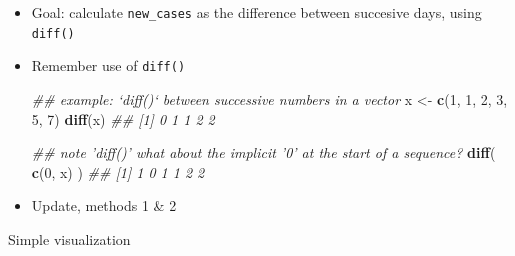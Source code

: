 \documentclass[
]{book}
\newenvironment{Shaded}{\begin{snugshade}}{\end{snugshade}}
\newcommand{\CommentTok}[1]{\textcolor[rgb]{0.56,0.35,0.01}{\textit{#1}}}
\newcommand{\DecValTok}[1]{\textcolor[rgb]{0.00,0.00,0.81}{#1}}
\newcommand{\KeywordTok}[1]{\textcolor[rgb]{0.13,0.29,0.53}{\textbf{#1}}}
\newcommand{\NormalTok}[1]{#1}
\newcommand{\OperatorTok}[1]{\textcolor[rgb]{0.81,0.36,0.00}{\textbf{#1}}}
\newcommand{\StringTok}[1]{\textcolor[rgb]{0.31,0.60,0.02}{#1}}
\begin{document}
\begin{itemize}
\item
  Goal: calculate \texttt{new\_cases} as the difference between succesive days, using \texttt{diff()}
\item
  Remember use of \texttt{diff()}

\begin{Shaded}
\begin{Highlighting}[]
\CommentTok{## example: `diff()` between successive numbers in a vector}
\NormalTok{x <-}\StringTok{ }\KeywordTok{c}\NormalTok{(}\DecValTok{1}\NormalTok{, }\DecValTok{1}\NormalTok{, }\DecValTok{2}\NormalTok{, }\DecValTok{3}\NormalTok{, }\DecValTok{5}\NormalTok{, }\DecValTok{7}\NormalTok{)}
\KeywordTok{diff}\NormalTok{(x)}
\CommentTok{## [1] 0 1 1 2 2}

\CommentTok{## note 'diff()' what about the implicit '0' at the start of a sequence?}
\KeywordTok{diff}\NormalTok{( }\KeywordTok{c}\NormalTok{(}\DecValTok{0}\NormalTok{, x) )}
\CommentTok{## [1] 1 0 1 1 2 2}
\end{Highlighting}
\end{Shaded}
\item
  Update, methods 1 \& 2

\begin{Shaded}
\end{Shaded}
\end{itemize}

Simple visualization
\end{document}
